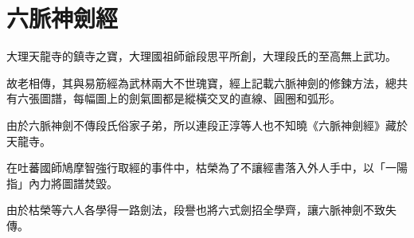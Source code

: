 \section{六脈神劍經}
大理天龍寺的鎮寺之寶，大理國祖師爺段思平所創，大理段氏的至高無上武功。

故老相傳，其與易筋經為武林兩大不世瑰寶，經上記載六脈神劍的修鍊方法，總共有六張圖譜，每幅圖上的劍氣圖都是縱橫交叉的直線、圓圈和弧形。

由於六脈神劍不傳段氏俗家子弟，所以連段正淳等人也不知曉《六脈神劍經》藏於天龍寺。

在吐蕃國師鳩摩智強行取經的事件中，枯榮為了不讓經書落入外人手中，以「一陽指」內力將圖譜焚毀。

由於枯榮等六人各學得一路劍法，段譽也將六式劍招全學齊，讓六脈神劍不致失傳。

